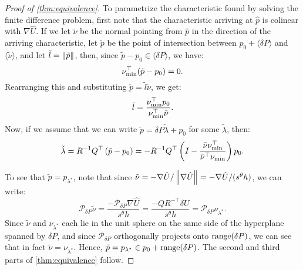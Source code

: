 \documentclass[sisc-eikonal.tex]{subfiles}
\begin{document}
\begin{proof}[Proof of \cref{thm:equivalence}]
  To parametrize the characteristic found by solving the finite
  difference problem, first note that the characteristic arriving at
  $\hat{p}$ is colinear with $\nabla \hat{U}$. If we let $\tilde{\nu}$
  be the normal pointing from $\hat{p}$ in the direction of the
  arriving characteristic, let $\tilde{p}$ be the point of
  intersection between $p_0 + \langle \delta P \rangle$ and
  $\langle \tilde{\nu} \rangle$, and let
  $\tilde{l} = \left\|\tilde{p}\right\|$, then, since
  $\tilde{p} - p_0 \in \langle \delta P \rangle$, we have:
  \begin{equation}
    \nu_{\operatorname{min}}^\top (\tilde{p} - p_0) = 0.
  \end{equation}
  Rearranging this and substituting
  $\tilde{p} = \tilde{l} \tilde{\nu}$, we get:
  \begin{equation}
    \tilde{l} = \frac{\nu_{\operatorname{min}}^\top p_0}{\nu_{\operatorname{min}}^\top \tilde{\nu}}.
  \end{equation}
  Now, if we assume that we can write
  $\tilde{p} = \delta P \tilde{\lambda} + p_0$ for some
  $\tilde{\lambda}$, then:
  \begin{equation}
    \tilde{\lambda} = R^{-1} Q^\top \left(\tilde{p} - p_0\right) = -R^{-1} Q^\top \left(I - \frac{\tilde{\nu} \nu_{\operatorname{min}}^\top}{\tilde{\nu}^\top \nu_{\operatorname{min}}}\right) p_0.
  \end{equation}

  To see that $\tilde{p} = p_{\lambda^*}$, note that since
  $\tilde{\nu} = -\nabla \hat{U}/\left\|\nabla \hat{U}\right\| = -\nabla
  \hat{U}/(s^\theta h)$, we can write:
  \begin{equation}
    \mathcal{P}_{\delta P} \tilde{\nu} = \frac{-\mathcal{P}_{\delta P} \nabla \hat{U}}{s^\theta h} = \frac{-QR^{-\top} \delta U}{s^\theta h} = \mathcal{P}_{\delta P} \nu_{\lambda^*}.
  \end{equation}
  Since $\tilde{\nu}$ and $\nu_{\lambda^*}$ each lie in the unit
  sphere on the same side of the hyperplane spanned by $\delta P$, and
  since $\mathcal{P}_{\delta P}$ orthogonally projects onto
  $\operatorname{range}(\delta P)$, we can see that in fact
  $\tilde{\nu} = \nu_{\lambda^*}$. Hence,
  $\tilde{p} = p_{\lambda^*} \in p_0 + \operatorname{range}(\delta P)$. The second
  and third parts of \cref{thm:equivalence} follow.
\end{proof}
\end{document}

